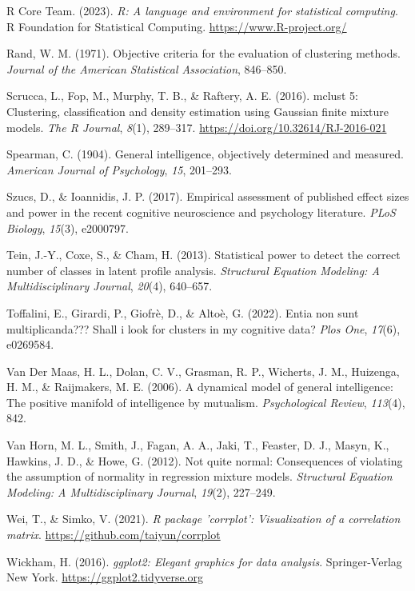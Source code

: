 \documentclass[
  man,floatsintext]{apa7}
\newlength{\cslhangindent}
\newlength{\cslentryspacingunit} %
\newenvironment{CSLReferences}[2] %
 {%
  \setlength{\parindent}{0pt}
  \ifodd #1
  \let\oldpar\par
  \def\par{\hangindent=\cslhangindent\oldpar}
  \fi
  \setlength{\parskip}{#2\cslentryspacingunit}
 }%
 {}
\begin{document}
\begin{CSLReferences}{1}{0}
\leavevmode{}%
R Core Team. (2023). \emph{R: A language and environment for statistical computing}. R Foundation for Statistical Computing. \url{https://www.R-project.org/}

\leavevmode{}%
Rand, W. M. (1971). Objective criteria for the evaluation of clustering methods. \emph{Journal of the American Statistical Association}, 846--850.

\leavevmode{}%
Scrucca, L., Fop, M., Murphy, T. B., \& Raftery, A. E. (2016). {mclust} 5: Clustering, classification and density estimation using {G}aussian finite mixture models. \emph{The {R} Journal}, \emph{8}(1), 289--317. \url{https://doi.org/10.32614/RJ-2016-021}

\leavevmode{}%
Spearman, C. (1904). General intelligence, objectively determined and measured. \emph{American Journal of Psychology}, \emph{15}, 201--293.

\leavevmode{}%
Szucs, D., \& Ioannidis, J. P. (2017). Empirical assessment of published effect sizes and power in the recent cognitive neuroscience and psychology literature. \emph{PLoS Biology}, \emph{15}(3), e2000797.

\leavevmode{}%
Tein, J.-Y., Coxe, S., \& Cham, H. (2013). Statistical power to detect the correct number of classes in latent profile analysis. \emph{Structural Equation Modeling: A Multidisciplinary Journal}, \emph{20}(4), 640--657.

\leavevmode{}%
Toffalini, E., Girardi, P., Giofrè, D., \& Altoè, G. (2022). Entia non sunt multiplicanda??? Shall i look for clusters in my cognitive data? \emph{Plos One}, \emph{17}(6), e0269584.

\leavevmode{}%
Van Der Maas, H. L., Dolan, C. V., Grasman, R. P., Wicherts, J. M., Huizenga, H. M., \& Raijmakers, M. E. (2006). A dynamical model of general intelligence: The positive manifold of intelligence by mutualism. \emph{Psychological Review}, \emph{113}(4), 842.

\leavevmode{}%
Van Horn, M. L., Smith, J., Fagan, A. A., Jaki, T., Feaster, D. J., Masyn, K., Hawkins, J. D., \& Howe, G. (2012). Not quite normal: Consequences of violating the assumption of normality in regression mixture models. \emph{Structural Equation Modeling: A Multidisciplinary Journal}, \emph{19}(2), 227--249.

\leavevmode{}%
Wei, T., \& Simko, V. (2021). \emph{R package 'corrplot': Visualization of a correlation matrix}. \url{https://github.com/taiyun/corrplot}

\leavevmode{}%
Wickham, H. (2016). \emph{ggplot2: Elegant graphics for data analysis}. Springer-Verlag New York. \url{https://ggplot2.tidyverse.org}

\end{CSLReferences}
\end{document}
